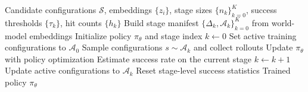\begin{algorithm}[t]
\caption{AGILE: Adaptive Generalization via Iterative Learning and Expansion}
\label{alg:agile}
\begin{algorithmic}[1]
\REQUIRE Candidate configurations $\mathcal{S}$, embeddings $\{z_i\}$, stage sizes $\{n_k\}_{k=0}^{K}$, success thresholds $\{\tau_k\}$, hit counts $\{h_k\}$
\STATE Build stage manifest $\{\Delta_k, \mathcal{A}_k\}_{k=0}^{K}$ from world-model embeddings
\STATE Initialize policy $\pi_\theta$ and stage index $k \leftarrow 0$
\STATE Set active training configurations to $\mathcal{A}_0$
    \STATE Sample configurations $s \sim \mathcal{A}_k$ and collect rollouts
    \STATE Update $\pi_\theta$ with policy optimization
    \STATE Estimate success rate on the current stage
        \STATE $k \leftarrow k + 1$
        \STATE Update active configurations to $\mathcal{A}_k$
        \STATE Reset stage-level success statistics
    \ENDIF
\ENDWHILE
\RETURN Trained policy $\pi_\theta$
\end{algorithmic}
\end{algorithm}
